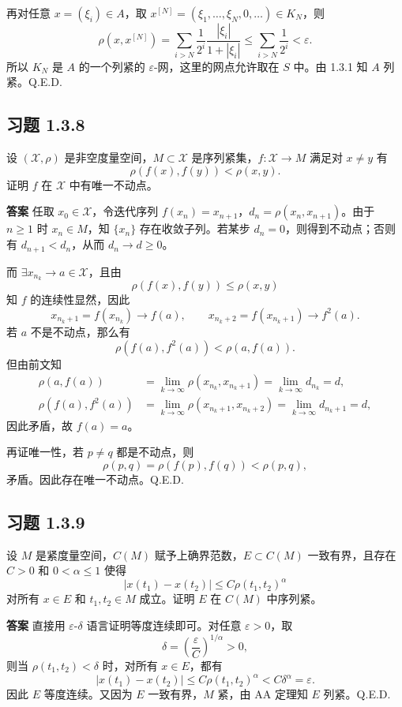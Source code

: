 \documentclass[UTF8,a4paper,11pt,fontset=fandol]{ctexart}
\newcommand{\exercise}[1]{\par\ifdim\dimexpr\pagegoal-\pagetotal\relax<7\baselineskip\newpage\fi\subsection*{习题 #1}}
\newcommand{\answer}{\par\smallskip\noindent\textbf{答案}\quad}
\newcommand{\qedherecustom}{\unskip\hfill\mbox{\normalfont Q.E.D.}\par}
\begin{document}
再对任意 $x=(\xi_i)\in A$，取 $x^{[N]}=(\xi_1,\ldots,\xi_N,0,\ldots)\in K_N$，则
\[
\rho(x,x^{[N]})=\sum_{i>N}\frac1{2^i}\frac{|\xi_i|}{1+|\xi_i|}
\leq\sum_{i>N}\frac1{2^i}<\varepsilon.
\]
所以 $K_N$ 是 $A$ 的一个列紧的 $\varepsilon$-网，这里的网点允许取在 $S$ 中。由 1.3.1 知 $A$ 列紧。\qedherecustom

\exercise{1.3.8}
设 $(\mathcal X,\rho)$ 是非空度量空间，$M\subset\mathcal X$ 是序列紧集，$f:\mathcal X\to M$ 满足对 $x\ne y$ 有
\[
\rho(f(x),f(y))<\rho(x,y).
\]
证明 $f$ 在 $\mathcal X$ 中有唯一不动点。

\answer
任取 $x_0\in\mathcal X$，令迭代序列 $f(x_n)=x_{n+1}$，$d_n=\rho(x_n,x_{n+1})$。由于 $n\geq1$ 时 $x_n\in M$，知 $\{x_n\}$ 存在收敛子列。若某步 $d_n=0$，则得到不动点；否则有 $d_{n+1}<d_n$，从而 $d_n\to d\geq0$。

而 $\exists x_{n_k}\to a\in\mathcal X$，且由
\[
\rho(f(x),f(y))\leq\rho(x,y)
\]
知 $f$ 的连续性显然，因此
\[
x_{n_k+1}=f(x_{n_k})\longrightarrow f(a),\qquad
x_{n_k+2}=f(x_{n_k+1})\longrightarrow f^2(a).
\]
若 $a$ 不是不动点，那么有
\[
\rho(f(a),f^2(a))<\rho(a,f(a)).
\]
但由前文知
\[
\begin{aligned}
\rho(a,f(a))&=\lim_{k\to\infty}\rho(x_{n_k},x_{n_k+1})
=\lim_{k\to\infty}d_{n_k}=d,\\
\rho(f(a),f^2(a))&=\lim_{k\to\infty}\rho(x_{n_k+1},x_{n_k+2})
=\lim_{k\to\infty}d_{n_k+1}=d,
\end{aligned}
\]
因此矛盾，故 $f(a)=a$。

再证唯一性，若 $p\ne q$ 都是不动点，则
\[
\rho(p,q)=\rho(f(p),f(q))<\rho(p,q),
\]
矛盾。因此存在唯一不动点。\qedherecustom

\exercise{1.3.9}
设 $M$ 是紧度量空间，$C(M)$ 赋予上确界范数，$E\subset C(M)$ 一致有界，且存在 $C>0$ 和 $0<\alpha\leq1$ 使得
\[
|x(t_1)-x(t_2)|\leq C\rho(t_1,t_2)^\alpha
\]
对所有 $x\in E$ 和 $t_1,t_2\in M$ 成立。证明 $E$ 在 $C(M)$ 中序列紧。

\answer
直接用 $\varepsilon$-$\delta$ 语言证明等度连续即可。对任意 $\varepsilon>0$，取
\[
\delta=\left(\frac\varepsilon C\right)^{1/\alpha}>0,
\]
则当 $\rho(t_1,t_2)<\delta$ 时，对所有 $x\in E$，都有
\[
|x(t_1)-x(t_2)|\leq C\rho(t_1,t_2)^\alpha
<C\delta^\alpha=\varepsilon.
\]
因此 $E$ 等度连续。又因为 $E$ 一致有界，$M$ 紧，由 AA 定理知 $E$ 列紧。\qedherecustom
\end{document}
